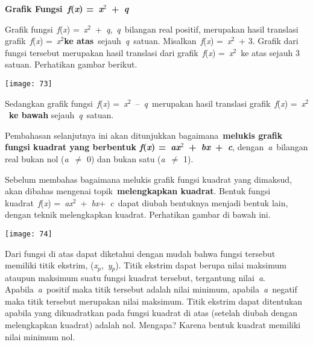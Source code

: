 \documentclass[11pt,fleqn]{book} %
\begin{document}
\noindent \textbf{Grafik Fungsi~\textit{f}(\textit{x}) =~\textit{x}${}^{2}$~+~\textit{q}}

\noindent 

\noindent Grafik fungsi~\textit{f}(\textit{x}) =~\textit{x}${}^{2}$~+~\textit{q},~\textit{q}~bilangan real positif, merupakan hasil translasi grafik~\textit{f}(\textit{x}) =~\textit{x}${}^{2}$\textbf{ke atas}~sejauh~\textit{q}~satuan. Misalkan~\textit{f}(\textit{x}) =~\textit{x}${}^{2}$~+ 3. Grafik dari fungsi tersebut merupakan hasil translasi dari grafik~\textit{f}(\textit{x}) =~\textit{x}${}^{2}$~ke atas sejauh 3 satuan. Perhatikan gambar berikut.

\noindent 

\begin{center}
\noindent \texttt{[image: 73]}\textbf{}
\end{center}

\noindent Sedangkan grafik fungsi~\textit{f}(\textit{x}) =~\textit{x}${}^{2}$~--~\textit{q~}merupakan hasil translasi grafik~\textit{f}(\textit{x}) =~\textit{x}${}^{2}$~\textbf{ke bawah }sejauh~\textit{q}~satuan.

\noindent \eject 

\noindent Pembahasan selanjutnya ini akan ditunjukkan bagaimana~\textbf{melukis grafik fungsi kuadrat yang berbentuk \textit{f}(\textit{x}) =~\textit{ax}${}^{2}$~+~\textit{bx}~+~\textit{c}}, dengan~\textit{a}~bilangan real bukan nol (\textit{a}~$\mathrm{\neq}$ 0) dan bukan satu (\textit{a}~$\mathrm{\neq}$ 1).

\noindent Sebelum membahas bagaimana melukis grafik fungsi kuadrat yang dimaksud, akan dibahas mengenai topik~\textbf{melengkapkan kuadrat}. Bentuk fungsi kuadrat~\textit{f}(\textit{x}) =~\textit{ax}${}^{2}$~+~\textit{bx}+~\textit{c}~dapat diubah bentuknya menjadi bentuk lain, dengan teknik melengkapkan kuadrat. Perhatikan gambar di bawah ini.

\begin{center}
\noindent \texttt{[image: 74]}\textbf{}
\end{center}

\noindent Dari fungsi di atas dapat diketahui dengan mudah bahwa fungsi tersebut memiliki titik ekstrim, (\textit{x${}_{p}$},~\textit{y${}_{p}$}). Titik ekstrim dapat berupa nilai maksimum ataupun maksimum suatu fungsi kuadrat tersebut, tergantung nilai~\textit{a}. Apabila~\textit{a}~positif maka titik tersebut adalah nilai minimum, apabila~\textit{a}~negatif maka titik tersebut merupakan nilai maksimum. Titik ekstrim dapat ditentukan apabila yang dikuadratkan pada fungsi kuadrat di atas (setelah diubah dengan melengkapkan kuadrat) adalah nol. Mengapa? Karena bentuk kuadrat memiliki nilai minimum nol.
\end{document}
